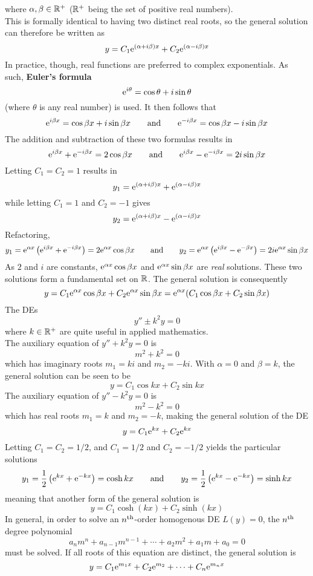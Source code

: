 \documentclass[./Differential Equations]{subfiles}
\begin{document}
					where \(\alpha, \beta \in \mathbb{R}^+\) (\(\mathbb{R}^+\) being the set of positive real numbers). \\
					This is formally identical to having two distinct real roots, so the general solution can therefore be written as
					\[y = C_1\text{e}^{(\alpha + i\beta)x} + C_2\text{e}^{(\alpha - i\beta)x}\]
					In practice, though, real functions are preferred to complex exponentials. As such, \textbf{Euler's formula}
					\[\text{e}^{i\theta} = \cos\theta + i\sin\theta\]
					(where \(\theta\) is any real number) is used. It then follows that
					\[
						\text{e}^{i\beta x} = \cos\beta x + i\sin\beta x \qquad \text{and} \qquad
								\text{e}^{-i\beta x} = \cos\beta x - i\sin\beta x
					\]
					The addition and subtraction of these two formulas results in
					\[
						\text{e}^{i\beta x} + \text{e}^{-i\beta x} = 2\cos\beta x \qquad \text{and} \qquad
								\text{e}^{i\beta x} - \text{e}^{-i\beta x} = 2i\sin \beta x	
					\]
					Letting \(C_1 = C_2 = 1\) results in
					\[
						y_1 = \text{e}^{(\alpha + i\beta)x} + \text{e}^{(\alpha - i\beta)x}
					\]
					while letting \(C_1 = 1\) and \(C_2 = -1\) gives
					\[
						y_2 = \text{e}^{(\alpha + i\beta)x} - \text{e}^{(\alpha - i\beta)x}
					\]
					Refactoring,
					\[
						y_1 = \text{e}^{\alpha x}\left(\text{e}^{i\beta x} + \text{e}^{-i\beta x}\right) = 2\text{e}^{\alpha x}\cos\beta x \qquad \text{and} \qquad
								y_2 = \text{e}^{\alpha x}\left(\text{e}^{i\beta x} - \text{e}^{-\beta x}\right) = 2i\text{e}^{\alpha x}\sin\beta x
					\]
					As \(2\) and \(i\) are constants, \(\text{e}^{\alpha x}\cos\beta x\) and \(\text{e}^{\alpha x}\sin\beta x\) are \textit{real} solutions. These two solutions form a fundamental set on \(\mathbb{R}\). The general solution is consequently
					\[
						y = C_1\text{e}^{\alpha x}\cos\beta x + C_2\text{e}^{\alpha x}\sin\beta x
							= \text{e}^{\alpha x}(C_1\cos\beta x + C_2\sin\beta x) 
					\]
				The DEs
					\[y'' \pm k^2y = 0\]
					where \(k \in \mathbb{R}^+\) are quite useful in applied mathematics. \\
				The auxiliary equation of \(y'' + k^2y = 0\) is
					\[m^2 + k^2 = 0\]
					which has imaginary roots \(m_1 = ki\) and \(m_2 = -ki\). With \(\alpha = 0\) and \(\beta = k\), the general solution can be seen to be
					\[y = C_1\cos kx + C_2\sin kx\]
				The auxiliary equation of \(y'' - k^2y = 0\) is
					\[m^2 - k^2 = 0\]
					which has real roots \(m_1 = k\) and \(m_2 = -k\), making the general solution of the DE
					\[y = C_1\text{e}^{kx} + C_2\text{e}^{kx}\]
				Letting \(C_1 = C_2 = 1/2\), and \(C_1 = 1/2\) and \(C_2 = -1/2\) yields the particular solutions
					\[
						y_1 = \frac{1}{2}\left(\text{e}^{kx} + \text{e}^{-kx}\right) = \cosh kx \qquad \text{and} \qquad
								y_2 = \frac{1}{2}\left(\text{e}^{kx} - \text{e}^{-kx}\right) = \sinh kx 
					\]
					meaning that another form of the general solution is
					\[y = C_1\cosh(kx) + C_2\sinh(kx)\]
				In general, in order to solve an \(n^{\text{th}}\)-order homogenous DE \(L(y) = 0\), the \(n^{\text{th}}\) degree polynomial
					\[a_nm^n + a_{n - 1}m^{n - 1} + \cdots + a_2m^2 + a_1m + a_0 = 0\]
					must be solved. If all roots of this equation are distinct, the general solution is
					\[y = C_1\text{e}^{m_1x} + C_2\text{e}^{m_2} + \cdots + C_n\text{e}^{m_nx}\]
\end{document}
